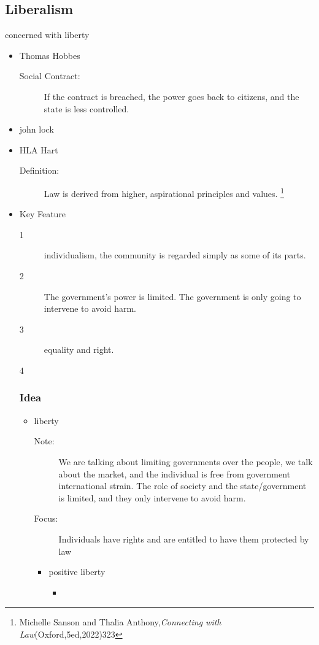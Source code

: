 \subsection*{Liberalism}
concerned with liberty 
\begin{itemize}
    \item Thomas Hobbes 
        \begin{description}
            \item[Social Contract:] If the contract is breached, the power goes back to citizens, and the state is less controlled. 
        \end{description}
    \item john lock
    \item HLA Hart
        \begin{description}
            \item[Definition:] Law is derived from higher, aspirational principles and values. \footnote{Michelle Sanson and Thalia Anthony,\textit{Connecting with Law}(Oxford,5ed,2022)323}
        \end{description}
    \item Key Feature
        \begin{description}
            \item[1] individualism, the community is regarded simply as some of its parts. 
            \item[2] The government's power is limited. The government is only going to intervene to avoid harm. 
            \item[3] equality and right. 
            \item[4]
        \end{description}

    \subsubsection*{Idea}
        \begin{itemize}
            \item liberty
                \begin{description}
                    \item[Note:] We are talking about limiting governments over the people, we talk about the market, and the individual is free from government international strain. The role of society and the state/government is limited, and they only intervene to avoid harm. 
                    \item[Focus:] Individuals have rights and are entitled to have them protected by law
                \end{description}
                \begin{itemize}
                    \item positive liberty
                        \begin{itemize}
                            \item 
                            

\end{itemize}
\end{itemize}
\end{itemize}
\end{itemize}
